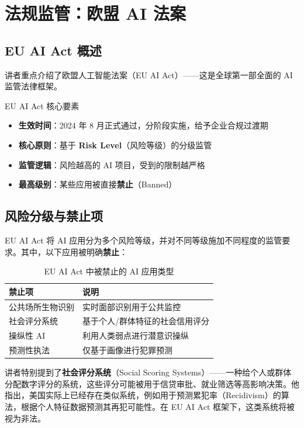 \section{法规监管：欧盟 AI 法案}

\subsection{EU AI Act 概述}

讲者重点介绍了欧盟人工智能法案（EU AI Act）——这是全球第一部全面的 AI 监管法律框架。

\begin{importantbox}{EU AI Act 核心要素}
\begin{itemize}
    \item \textbf{生效时间}：2024 年 8 月正式通过，分阶段实施，给予企业合规过渡期
    \item \textbf{核心原则}：基于 \textbf{Risk Level}（风险等级）的分级监管
    \item \textbf{监管逻辑}：风险越高的 AI 项目，受到的限制越严格
    \item \textbf{最高级别}：某些应用被直接\textbf{禁止}（Banned）
\end{itemize}
\end{importantbox}

\subsection{风险分级与禁止项}

EU AI Act 将 AI 应用分为多个风险等级，并对不同等级施加不同程度的监管要求。其中，以下应用被明确\textbf{禁止}：

\begin{table}[H]
\centering
\caption{EU AI Act 中被禁止的 AI 应用类型}
\begin{tabular}{@{}ll@{}}
\toprule
\textbf{禁止项} & \textbf{说明} \\
\midrule
公共场所生物识别 & 实时面部识别用于公共监控 \\
社会评分系统 & 基于个人/群体特征的社会信用评分 \\
操纵性 AI & 利用人类弱点进行潜意识操纵 \\
预测性执法 & 仅基于画像进行犯罪预测 \\
\bottomrule
\end{tabular}
\end{table}

讲者特别提到了\textbf{社会评分系统}（Social Scoring Systems）——一种给个人或群体分配数字评分的系统，这些评分可能被用于信贷审批、就业筛选等高影响决策。他指出，美国实际上已经存在类似系统，例如用于预测累犯率（Recidivism）的算法，根据个人特征数据预测其再犯可能性。在 EU AI Act 框架下，这类系统将被视为非法。

